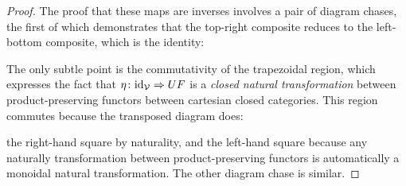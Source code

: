 \begin{proof}
The proof that these maps are inverses involves a pair of diagram chases, the first of which demonstrates that the top-right composite reduces to the left-bottom composite, which is the identity:
\begin{center}
\end{center}
The only subtle point is the commutativity of the trapezoidal region, which expresses the fact that $\eta \colon \textup{id}_{\mathord{\mathcal{V}}} \Rightarrow UF$ is a \emph{closed natural transformation} between product-preserving functors between cartesian closed categories. This region commutes because the transposed diagram does:
\begin{center}
\end{center}
the right-hand square by naturality, and the left-hand square because any naturally transformation between product-preserving functors is automatically a monoidal natural transformation. %
  The other diagram chase is similar.
\end{proof}

